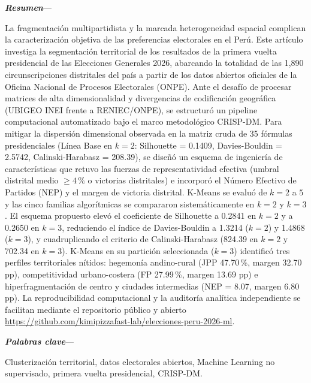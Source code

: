 \documentclass[conference,10pt,letterpaper]{IEEEtran}
\makeatletter
\renewenvironment{abstract}{%
  \normalfont\@IEEEabskeysecsize
  \noindent\textbf{\textit{\abstractname}}---\relax
}{\par\normalfont\normalsize}
\renewenvironment{IEEEkeywords}{%
  \normalfont\@IEEEabskeysecsize
  \noindent\textbf{\textit{\IEEEkeywordsname}}---\relax
}{\par\normalfont\normalsize}
\makeatother
\begin{document}
\thispagestyle{lacceiheader}
\pagestyle{lacceiheader}

\renewcommand\abstractname{Resumen}
\renewcommand\IEEEkeywordsname{Palabras clave}
\begin{abstract}
La fragmentación multipartidista y la marcada heterogeneidad espacial complican la caracterización objetiva de las preferencias electorales en el Perú. Este artículo investiga la segmentación territorial de los resultados de la primera vuelta presidencial de las Elecciones Generales 2026, abarcando la totalidad de las 1,890 circunscripciones distritales del país a partir de los datos abiertos oficiales de la Oficina Nacional de Procesos Electorales (ONPE). Ante el desafío de procesar matrices de alta dimensionalidad y divergencias de codificación geográfica (UBIGEO INEI frente a RENIEC/ONPE), se estructuró un pipeline computacional automatizado bajo el marco metodológico CRISP-DM. Para mitigar la dispersión dimensional observada en la matriz cruda de 35 fórmulas presidenciales (Línea Base en $k = 2$: Silhouette = 0.1409, Davies-Bouldin = 2.5742, Calinski-Harabasz = 208.39), se diseñó un esquema de ingeniería de características que retuvo las fuerzas de representatividad efectiva (umbral distrital medio $\ge 4\,\%$ o victorias distritales) e incorporó el Número Efectivo de Partidos (NEP) y el margen de victoria distrital. K-Means se evaluó de $k = 2$ a $5$ y las cinco familias algorítmicas se compararon sistemáticamente en $k = 2$ y $k = 3$. El esquema propuesto elevó el coeficiente de Silhouette a 0.2841 en $k = 2$ y a 0.2650 en $k = 3$, reduciendo el índice de Davies-Bouldin a 1.3214 ($k = 2$) y 1.4868 ($k = 3$), y cuadruplicando el criterio de Calinski-Harabasz (824.39 en $k = 2$ y 702.34 en $k = 3$). K-Means en su partición seleccionada ($k = 3$) identificó tres perfiles territoriales nítidos: hegemonía andino-rural (JPP 47.70\,\%, margen 32.70 pp), competitividad urbano-costera (FP 27.99\,\%, margen 13.69 pp) e hiperfragmentación de centro y ciudades intermedias (NEP = 8.07, margen 6.80 pp). La reproducibilidad computacional y la auditoría analítica independiente se facilitan mediante el repositorio público y abierto \url{https://github.com/kimipizzafast-lab/elecciones-peru-2026-ml}.
\end{abstract}

\begin{IEEEkeywords}
Clusterización territorial, datos electorales abiertos, Machine Learning no supervisado, primera vuelta presidencial, CRISP-DM.
\end{IEEEkeywords}
\end{document}

